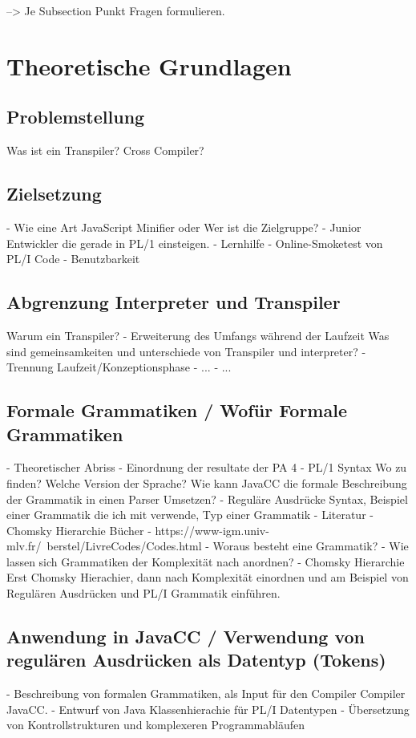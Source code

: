 --> Je Subsection Punkt Fragen formulieren.

\section{Theoretische Grundlagen}
	\subsection{Problemstellung}
     Was ist ein Transpiler?
     Cross Compiler?
     
	\subsection{Zielsetzung}
 - Wie eine Art JavaScript Minifier oder 
    Wer ist die Zielgruppe?
    - Junior Entwickler die gerade in PL/1 einsteigen.
    - Lernhilfe
    - Online-Smoketest von PL/I Code
    - Benutzbarkeit
    
	\subsection{Abgrenzung Interpreter und Transpiler}
    Warum ein Transpiler?
    - Erweiterung des Umfangs während der Laufzeit
    Was sind gemeinsamkeiten und unterschiede von Transpiler und interpreter?
    - Trennung Laufzeit/Konzeptionsphase
    - ...
    - ...
    
	\subsection{Formale Grammatiken / Wofür Formale Grammatiken}
     - Theoretischer Abriss
    - Einordnung der resultate der PA 4
	- PL/1 Syntax Wo zu finden? Welche Version der Sprache? 
     Wie kann JavaCC die formale Beschreibung der Grammatik in einen Parser Umsetzen?
	- Reguläre Ausdrücke Syntax, Beispiel einer Grammatik die ich mit verwende, Typ einer Grammatik
    - Literatur
	    - Chomsky Hierarchie Bücher
	    - https://www-igm.univ-mlv.fr/~berstel/LivreCodes/Codes.html
     - Woraus besteht eine Grammatik?
     - Wie lassen sich Grammatiken der Komplexität nach anordnen?
     - Chomsky Hierarchie
     Erst Chomsky Hierachier, dann nach Komplexität einordnen und am Beispiel von Regulären Ausdrücken und PL/I Grammatik einführen.
     
	\subsection{Anwendung in JavaCC / Verwendung von regulären Ausdrücken als Datentyp (Tokens)}
     - Beschreibung von formalen Grammatiken, als Input für den Compiler Compiler JavaCC.
     - Entwurf von Java Klassenhierachie für PL/I Datentypen
     - Übersetzung von Kontrollstrukturen und komplexeren Programmabläufen



